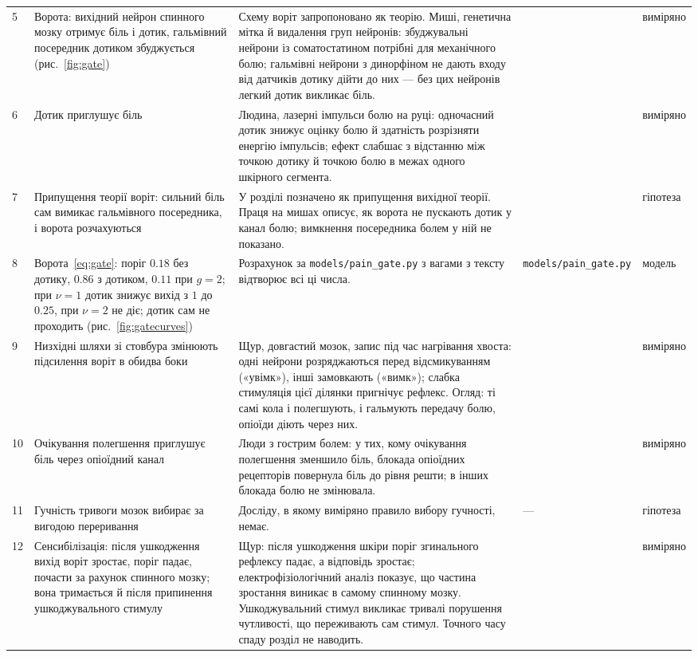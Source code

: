 {\begin{longtable}{>{\raggedright}p{0.5cm}>{\raggedright}p{4.0cm}>{\raggedright}p{5.6cm}>{\raggedright}p{2.3cm}>{\raggedright\arraybackslash}p{1.7cm}}
5 & Ворота: вихідний нейрон спинного мозку отримує біль і дотик, гальмівний посередник дотиком збуджується (рис.~\ref{fig:gate}) & Схему воріт запропоновано як теорію. Миші, генетична мітка й видалення груп нейронів: збуджувальні нейрони із соматостатином потрібні для механічного болю; гальмівні нейрони з динорфіном не дають входу від датчиків дотику дійти до них --- без цих нейронів легкий дотик викликає біль. & \cite{MelzackWall1965, Duan2014} & виміряно \\
6 & Дотик приглушує біль & Людина, лазерні імпульси болю на руці: одночасний дотик знижує оцінку болю й здатність розрізняти енергію імпульсів; ефект слабшає з відстанню між точкою дотику й точкою болю в межах одного шкірного сегмента. & \cite{Mancini2014touch} & виміряно \\
7 & Припущення теорії воріт: сильний біль сам вимикає гальмівного посередника, і ворота розчахуються & У розділі позначено як припущення вихідної теорії. Праця на мишах описує, як ворота не пускають дотик у канал болю; вимкнення посередника болем у ній не показано. & \cite{MelzackWall1965} & гіпотеза \\
8 & Ворота~\eqref{eq:gate}: поріг $0.18$ без дотику, $0.86$ з дотиком, $0.11$ при $g=2$; при $\nu=1$ дотик знижує вихід з $1$ до $0.25$, при $\nu=2$ не діє; дотик сам не проходить (рис.~\ref{fig:gatecurves}) & Розрахунок за \texttt{models/\allowbreak pain\_\allowbreak gate.py} з вагами з тексту відтворює всі ці числа. & \texttt{models/\allowbreak pain\_\allowbreak gate.py} & модель \\
9 & Низхідні шляхи зі стовбура змінюють підсилення воріт в обидва боки & Щур, довгастий мозок, запис під час нагрівання хвоста: одні нейрони розряджаються перед відсмикуванням («увімк»), інші замовкають («вимк»); слабка стимуляція цієї ділянки пригнічує рефлекс. Огляд: ті самі кола і полегшують, і гальмують передачу болю, опіоїди діють через них. & \cite{Fields1983rvm, Fields2004} & виміряно \\
10 & Очікування полегшення приглушує біль через опіоїдний канал & Люди з гострим болем: у тих, кому очікування полегшення зменшило біль, блокада опіоїдних рецепторів повернула біль до рівня решти; в інших блокада болю не змінювала. & \cite{Levine1978} & виміряно \\
11 & Гучність тривоги мозок вибирає за вигодою переривання & Досліду, в якому виміряно правило вибору гучності, немає. & --- & гіпотеза \\
12 & Сенсибілізація: після ушкодження вихід воріт зростає, поріг падає, почасти за рахунок спинного мозку; вона тримається й після припинення ушкоджувального стимулу & Щур: після ушкодження шкіри поріг згинального рефлексу падає, а відповідь зростає; електрофізіологічний аналіз показує, що частина зростання виникає в самому спинному мозку. Ушкоджувальний стимул викликає тривалі порушення чутливості, що переживають сам стимул. Точного часу спаду розділ не наводить. & \cite{Woolf1983} & виміряно \\

\end{longtable}}
